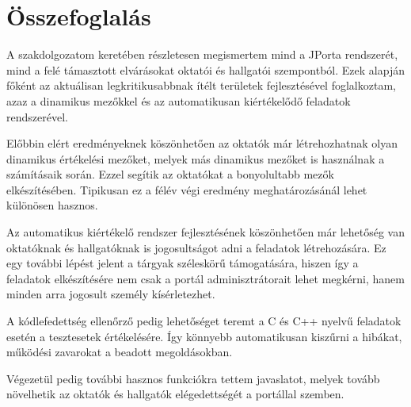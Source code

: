 \chapter*{Összefoglalás}

A szakdolgozatom keretében részletesen megismertem mind a JPorta rendszerét, mind a felé támasztott elvárásokat oktatói és hallgatói szempontból. Ezek alapján főként az aktuálisan legkritikusabbnak ítélt területek fejlesztésével foglalkoztam, azaz a dinamikus mezőkkel és az automatikusan kiértékelődő feladatok rendszerével.

Előbbin elért eredményeknek köszönhetően az oktatók már létrehozhatnak olyan dinamikus értékelési mezőket, melyek más dinamikus mezőket is használnak a számításaik során. Ezzel segítik az oktatókat a bonyolultabb mezők elkészítésében. Tipikusan ez a félév végi eredmény meghatározásánál lehet különösen hasznos.

Az automatikus kiértékelő rendszer fejlesztésének köszönhetően már lehetőség van oktatóknak és hallgatóknak is jogosultságot adni a feladatok létrehozására. Ez egy további lépést jelent a tárgyak széleskörű támogatására, hiszen így a feladatok elkészítésére nem csak a portál adminisztrátorait lehet megkérni, hanem minden arra jogosult személy kísérletezhet.

A kódlefedettség ellenőrző pedig lehetőséget teremt a C és C++ nyelvű feladatok esetén a tesztesetek értékelésére. Így könnyebb automatikusan kiszűrni a hibákat, működési zavarokat a beadott megoldásokban.

Végezetül pedig további hasznos funkciókra tettem javaslatot, melyek tovább növelhetik az oktatók és hallgatók elégedettségét a portállal szemben.